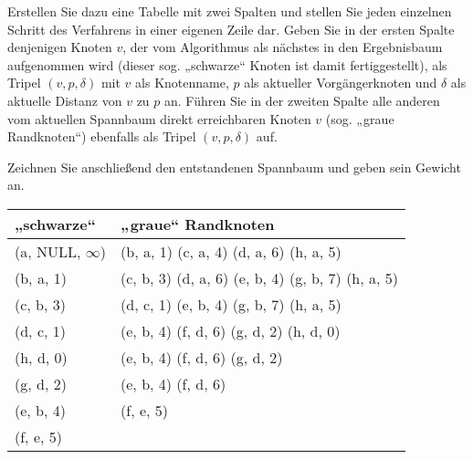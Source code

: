 \documentclass{bschlangaul-aufgabe}
\begin{document}
\begin{enumerate}
Erstellen Sie dazu eine Tabelle mit zwei Spalten und stellen Sie jeden
einzelnen Schritt des Verfahrens in einer eigenen Zeile dar. Geben Sie
in der ersten Spalte denjenigen Knoten $v$, der vom Algorithmus als
nächstes in den Ergebnisbaum aufgenommen wird (dieser sog.
„schwarze“ Knoten ist damit fertiggestellt), als Tripel $(v, p, \delta)$
mit $v$ als Knotenname, $p$ als aktueller Vorgängerknoten und $\delta$
als aktuelle Distanz von $v$ zu $p$ an. Führen Sie in der zweiten Spalte
alle anderen vom aktuellen Spannbaum direkt erreichbaren Knoten $v$
(sog. „graue Randknoten“) ebenfalls als Tripel $(v, p, \delta)$ auf.

Zeichnen Sie anschließend den entstandenen Spannbaum und geben sein
Gewicht an.

\begin{liAntwort}

\begin{tabular}{l|l}
„schwarze“ & „graue“ Randknoten \\\hline\hline
(a, NULL, $\infty$) & (b, a, 1) (c, a, 4) (d, a, 6) (h, a, 5) \\\hline
(b, a, 1) & (c, b, 3) (d, a, 6) (e, b, 4) (g, b, 7) (h, a, 5)  \\\hline
(c, b, 3) & (d, c, 1) (e, b, 4) (g, b, 7) (h, a, 5) \\\hline
(d, c, 1) & (e, b, 4) (f, d, 6) (g, d, 2) (h, d, 0) \\\hline
(h, d, 0) & (e, b, 4) (f, d, 6) (g, d, 2) \\\hline
(g, d, 2) & (e, b, 4) (f, d, 6) \\\hline
(e, b, 4) & (f, e, 5) \\\hline
(f, e, 5) & \\\hline
\end{tabular}

\begin{center}


\end{center}
\end{liAntwort}
\end{enumerate}
\end{document}
